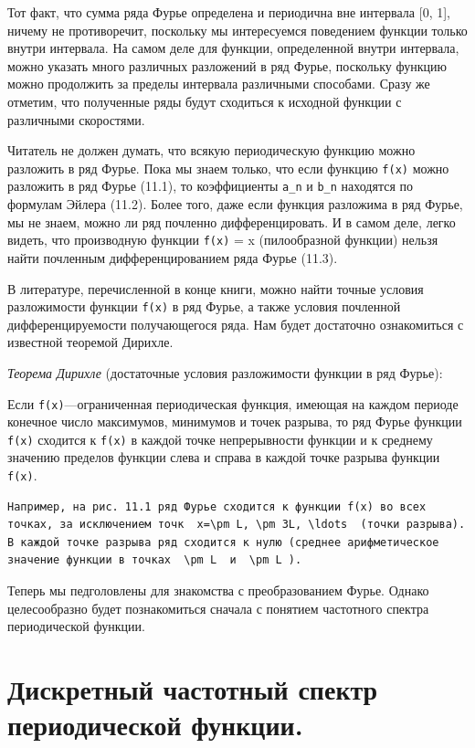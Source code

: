 \documentclass[
  ukrainian,
]{article}
\begin{document}
Тот факт, что сумма ряда Фурье определена и периодична вне интервала
{[}0, 1{]}, ничему не противоречит, поскольку мы интересуемся поведением
функции только внутри интервала. На самом деле для функции, определенной
внутри интервала, можно указать много различных разложений в ряд Фурье,
поскольку функцию можно продолжить за пределы интервала различными
способами. Сразу же отметим, что полученные ряды будут сходиться к
исходной функции с различными скоростями.

Читатель не должен думать, что всякую периодическую функцию можно
разложить в ряд Фурье. Пока мы знаем только, что если функцию
\texttt{f(x)} можно разложить в ряд Фурье (11.1), то коэффициенты
\texttt{a\_n} и \texttt{b\_n} находятся по формулам Эйлера (11.2). Более
того, даже если функция разложима в ряд Фурье, мы не знаем, можно ли ряд
почленно дифференцировать. И в самом деле, легко видеть, что производную
функции \texttt{f(x)} = x (пилообразной функции) нельзя найти почленным
дифференцированием ряда Фурье (11.3).

В литературе, перечисленной в конце книги, можно найти точные условия
разложимости функции \texttt{f(x)} в ряд Фурье, а также условия
почленной дифференцируемости получающегося ряда. Нам будет достаточно
ознакомиться с известной теоремой Дирихле.

\emph{Теорема Дирихле} (достаточные условия разложимости функции в ряд
Фурье):

Если \texttt{f(x)}---ограниченная периодическая функция, имеющая на
каждом периоде конечное число максимумов, минимумов и точек разрыва, то
ряд Фурье функции \texttt{f(x)} сходится к \texttt{f(x)} в каждой точке
непрерывности функции и к среднему значению пределов функции слева и
справа в каждой точке разрыва функции \texttt{f(x)}.

\begin{verbatim}
Например, на рис. 11.1 ряд Фурье сходится к функции f(x) во всех точках, за исключением точк  x=\pm L, \pm 3L, \ldots  (точки разрыва). В каждой точке разрыва ряд сходится к нулю (среднее арифметическое значение функции в точках  \pm L  и  \pm L ).
\end{verbatim}

Теперь мы педголовлены для знакомства с преобразованием Фурье. Однако
целесообразно будет познакомиться сначала с понятием частотного спектра
периодической функции.

\section{Дискретный частотный спектр периодической
функции.}\label{ux434ux438ux441ux43aux440ux435ux442ux43dux44bux439-ux447ux430ux441ux442ux43eux442ux43dux44bux439-ux441ux43fux435ux43aux442ux440-ux43fux435ux440ux438ux43eux434ux438ux447ux435ux441ux43aux43eux439-ux444ux443ux43dux43aux446ux438ux438.}
\end{document}
